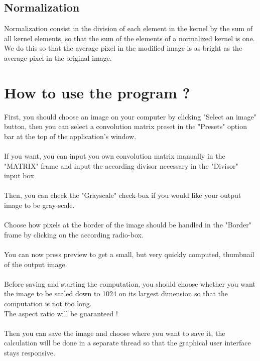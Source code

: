 \documentclass[]{article}
\begin{document}
\subsection{Normalization}
Normalization consist in the division of each element in the kernel by the sum of all kernel elements,
so that the sum of the elements of a normalized kernel is one. We do this so that the average pixel in
the modified image is as bright as the average pixel in the original image.

\newpage
\section{How to use the program ?}
First, you should choose an image on your computer by clicking "Select an image" button, then you can select a convolution matrix preset 
in the "Presets" option bar at the top of the application's window.
\\\\
If you want, you can input you own convolution matrix manually in the "MATRIX" frame and input the according divisor 
necessary in the "Divisor" input box
\\\\
Then, you can check the "Grayscale" check-box if you would like your output image to be gray-scale.
\\\\
Choose how pixels at the border of the image should be handled in the "Border" frame by clicking on the according radio-box.
\\\\
You can now press preview to get a small, but very quickly computed, thumbnail of the output image.
\\\\
Before saving and starting the computation, you should choose whether you want the image to be scaled down to 1024 on its largest
dimension so that the computation is not too long.  \\The aspect ratio will be guaranteed !
\\\\
Then you can save the image and choose where you want to save it, the calculation will be done in a separate thread so that the graphical
user interface stays responsive.

\newpage
\end{document}
